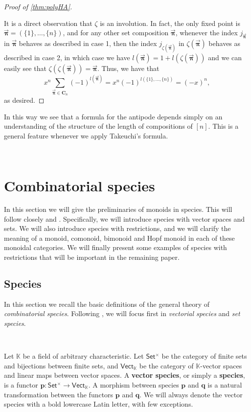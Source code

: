 \documentclass[12pt, reqno]{amsart}
\theoremstyle{definition}
\newcommand{\oPi}{\mathbf{C}}
\newcommand{\opi}{\vec{\boldsymbol{\pi}}}
\newcommand{\Fset}{\mathsf{Set^{\times}}}
\newcommand{\Vect}{\mathsf{Vect}}
\newcommand{\tp}{\mathbf{p}}
\newcommand{\tq}{\mathbf{q}}
\begin{document}
\begin{proof}[Proof of \cref{thm:polyHA}]
\begin{enumerate}
\end{enumerate}

It is a direct observation that $\zeta $ is an involution.
In fact, the only fixed point is $\opi = (\{1\}, \dots , \{n\})$, and for any other set composition $\opi$, whenever the index $j_{\opi}$ in $\opi $ behaves as described in case 1, then the index $j_{\zeta(\opi)}$ in $\zeta ( \opi ) $ behaves as described in case 2, in which case we have $l(\opi) = 1+l(\zeta (\opi))$ and we can easily see that $\zeta(\zeta(\opi )) = \opi$.
Thus, we have that 
\[x^n \sum_{\opi \in \oPi_n} (-1)^{l(\opi)} = x^n (-1)^{l(\{1\}, \dots, \{n\} )}= (-x)^n,\] 
as desired.
\end{proof}


In this way we see that a formula for the antipode depends simply on an understanding of the structure of the length of compositions of $[n]$.
This is a general feature whenever we apply Takeuchi's formula.





\

\section{Combinatorial species\label{sec:species}}


In this section we will give the preliminaries of monoids in species.
This will follow closely \cite{AM2010} and \cite{Schmitt1993}.
Specifically, we will introduce species with vector spaces and sets.
We will also introduce species with restrictions, and we will clarify the meaning of a monoid, comonoid, bimonoid and Hopf monoid in each of these monoidal categories.
We will finally present some examples of species with restrictions that will be important in the remaining paper. 

\subsection{Species}
In this section we recall the basic definitions of the general theory of \emph{combinatorial species}. Following \cite{AM2010}, we will focus first in \emph{vectorial species} and \emph{set species}.

\

Let $\mathbb{K}$ be a field of arbitrary characteristic. Let $\Fset$ be the category of finite sets and bijections between finite sets, and $\Vect_{\mathbb{K}}$ be the category of $\mathbb{K}$-vector spaces and linear maps between vector spaces. A {\bf vector species}, or simply a \textbf{species}, is a functor $\tp: \Fset \to \Vect_{\mathbb{K}}$. A morphism between species $\tp$ and $\tq$ is a natural transformation between the functors $\tp$ and $\tq$.
We will always denote the vector species with a bold lowercase Latin letter, with few exceptions.
\end{document}
